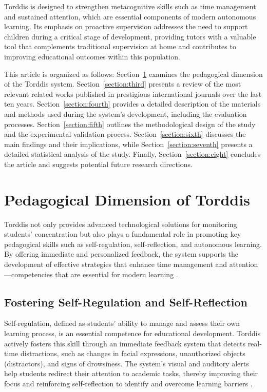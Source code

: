 		Torddis is designed to strengthen metacognitive skills such as time management and sustained attention, which are essential components of modern autonomous learning. Its emphasis on proactive supervision addresses the need to support children during a critical stage of development, providing tutors with a valuable tool that complements traditional supervision at home and contributes to improving educational outcomes within this population.
		
		This article is organized as follows: Section~\ref{section:second} examines the pedagogical dimension of the Torddis system. Section~\ref{section:third} presents a review of the most relevant related works published in prestigious international journals over the last ten years. Section~\ref{section:fourth} provides a detailed description of the materials and methods used during the system's development, including the evaluation processes. Section~\ref{section:fifth} outlines the methodological design of the study and the experimental validation process. Section~\ref{section:sixth} discusses the main findings and their implications, while Section~\ref{section:seventh} presents a detailed statistical analysis of the study. Finally, Section~\ref{section:eight} concludes the article and suggests potential future research directions.
				
	\section{Pedagogical Dimension of Torddis}
	\label{section:second}
		
		Torddis not only provides advanced technological solutions for monitoring students' concentration but also plays a fundamental role in promoting key pedagogical skills such as self-regulation, self-reflection, and autonomous learning. By offering immediate and personalized feedback, the system supports the development of effective strategies that enhance time management and attention—competencies that are essential for modern learning \citep{Loh2025Plugging}.
		
		\subsection{Fostering Self-Regulation and Self-Reflection}
			Self-regulation, defined as students’ ability to manage and assess their own learning process, is an essential competence for educational development. Torddis actively fosters this skill through an immediate feedback system that detects real-time distractions, such as changes in facial expressions, unauthorized objects (distractors), and signs of drowsiness. The system’s visual and auditory alerts help students redirect their attention to academic tasks, thereby improving their focus and reinforcing self-reflection to identify and overcome learning barriers \citep{Ackermans2025Young,Li2024Systematic}.
			
